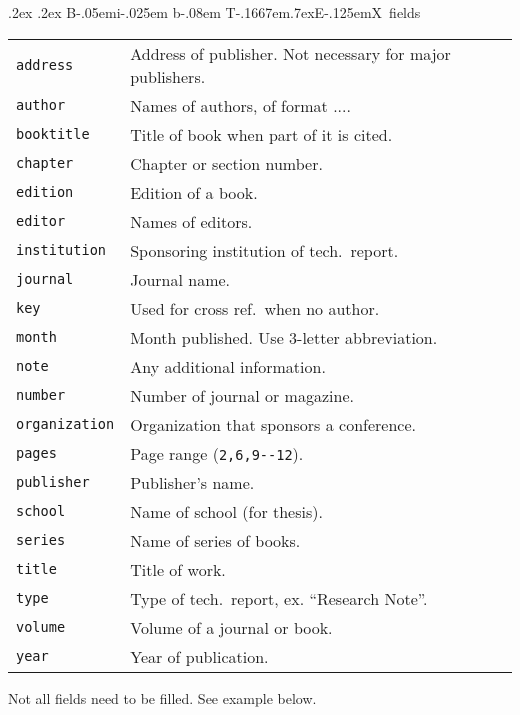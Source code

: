 \documentclass[10pt,landscape]{article}
\makeatletter
\renewcommand{\subsection}{\@startsection{subsection}{2}{0mm}%
                                {.2ex}%
                                {.2ex}%
                                {\normalfont\normalsize\bfseries}}
\def\BibTeX{{\rm B\kern-.05em{\sc i\kern-.025em b}\kern-.08em
    T\kern-.1667em\lower.7ex\hbox{E}\kern-.125emX}}
\makeatother
\begin{document}
\begin{multicols}{3}
\subsection{\BibTeX\ fields}
\begin{tabular}{@{}p{\the\MyLen}@{}p{\linewidth-\the\MyLen}@{}}
\verb!address!         &  Address of publisher.  Not necessary for major
                                publishers.  \\
\verb!author!           &  Names of authors, of format .... \\
\verb!booktitle!        &  Title of book when part of it is cited. \\
\verb!chapter!          &  Chapter or section number. \\
\verb!edition!          &  Edition of a book. \\
\verb!editor!           &  Names of editors. \\
\verb!institution!      &  Sponsoring institution of tech.\ report. \\
\verb!journal!          &  Journal name. \\
\verb!key!              &  Used for cross ref.\ when no author. \\
\verb!month!            &  Month published. Use 3-letter abbreviation. \\
\verb!note!             &  Any additional information. \\
\verb!number!           &  Number of journal or magazine. \\
\verb!organization!     &  Organization that sponsors a conference. \\
\verb!pages!            &  Page range (\verb!2,6,9--12!). \\
\verb!publisher!        &  Publisher's name. \\
\verb!school!           &  Name of school (for thesis). \\
\verb!series!           &  Name of series of books. \\
\verb!title!            &  Title of work. \\
\verb!type!             &  Type of tech.\ report, ex. ``Research Note''. \\
\verb!volume!           &  Volume of a journal or book. \\
\verb!year!             &  Year of publication. \\
\end{tabular}
Not all fields need to be filled.  See example below.


\end{multicols}
\end{document}
